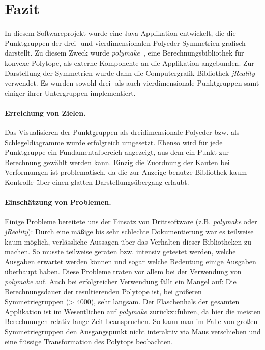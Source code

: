 \section{Fazit}
In diesem Softwareprojekt wurde eine Java-Applikation entwickelt, die die Punktgruppen der drei- und vierdimensionalen
Polyeder-Symmetrien grafisch darstellt. Zu diesem Zweck wurde \emph{polymake}~\cite{polymake}, eine Berechnungsbibliothek für
konvexe Polytope, als externe Komponente an die Applikation angebunden. Zur Darstellung der Symmetrien wurde dann die Computergrafik-Bibliothek
\emph{jReality}~\cite{jreality} verwendet.
Es wurden sowohl drei- als auch vierdimensionale Punktgruppen samt einiger ihrer Untergruppen implementiert.

\paragraph{Erreichung von Zielen.}
Das Visualisieren der Punktgruppen als dreidimensionale Polyeder bzw. als Schlegeldiagramme wurde erfolgreich umgesetzt. Ebenso wird für jede Punktgruppe ein Fundamentalbereich angezeigt, aus dem ein Punkt zur Berechnung gewählt werden kann. 
Einzig die Zuordnung der Kanten bei Verformungen ist problematisch, da die zur Anzeige benutze Bibliothek kaum Kontrolle über
einen glatten Darstellungsübergang erlaubt.

\paragraph{Einschätzung von Problemen.}
Einige Probleme bereitete uns der Einsatz von Drittsoftware (z.B. \emph{polymake} oder \emph{jReality}): Durch eine mäßige bis sehr schlechte
Dokumentierung war es teilweise kaum möglich, verlässliche Aussagen über das Verhalten dieser Bibliotheken zu machen. So musste teilweise geraten bzw. intensiv getestet werden, welche Ausgaben erwartet werden können und sogar welche Bedeutung einige Ausgaben überhaupt haben. Diese Probleme traten vor allem bei der Verwendung von \emph{polymake} auf.
Auch bei erfolgreicher Verwendung fällt ein Mangel auf: Die Berechnungsdauer der resultierenden Polytope ist, bei größeren Symmetriegruppen (> 4000), sehr langsam. Der Flaschenhals der gesamten Applikation ist im Wesentlichen auf \emph{polymake} zurückzuführen, da hier die meisten Berechnungen relativ lange Zeit beanspruchen. So kann man im Falle von großen Symmetriegruppen den Ausgangspunkt nicht interaktiv via Maus
verschieben und eine flüssige Transformation des Polytops beobachten.

